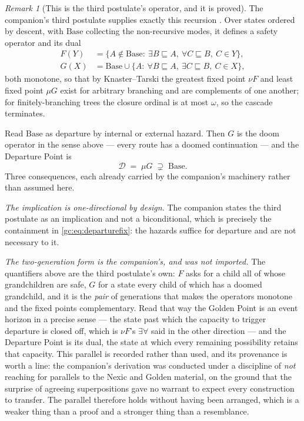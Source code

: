 \documentclass[11pt]{article}
\numberwithin{equation}{section}
\theoremstyle{plain}
\theoremstyle{definition}
\theoremstyle{remark}
\newtheorem{remark}[theorem]{Remark}
\begin{document}
\begin{remark}[This is the third postulate's operator, and it is proved]
\label{gc:rem:thirdpostulate}
The companion's third postulate supplies exactly this recursion
\cite{Aethus}. Over states ordered by descent, with $\mathrm{Base}$
collecting the non-recursive modes, it defines a safety operator and
its dual
\begin{align*}
F(Y)&=\bigl\{A\notin\mathrm{Base}:\ \exists B\sqsubseteq A,\
\forall C\sqsubseteq B,\ C\in Y\bigr\},\\
G(X)&=\mathrm{Base}\cup\bigl\{A:\ \forall B\sqsubseteq A,\
\exists C\sqsubseteq B,\ C\in X\bigr\},
\end{align*}
both monotone, so that by Knaster--Tarski the greatest fixed point
$\nu F$ and least fixed point $\mu G$ exist for arbitrary branching and
are complements of one another; for finitely-branching trees the
closure ordinal is at most $\omega$, so the cascade terminates.

Read $\mathrm{Base}$ as departure by internal or external hazard.
Then $G$ is the doom operator in the sense above --- every route has a
doomed continuation --- and the Departure Point is
\begin{equation}\label{gc:eq:departurefix}
\mathcal{D}\;=\;\mu G\;\supsetneq\;\mathrm{Base}.
\end{equation}
Three consequences, each already carried by the companion's
machinery rather than assumed here.

\emph{The implication is one-directional by design.} The companion
states the third postulate as an implication and not a biconditional,
which is precisely the containment in \eqref{gc:eq:departurefix}: the
hazards suffice for departure and are not necessary to it.

\emph{The two-generation form is the companion's, and was not imported.}
The quantifiers above are the third postulate's own: $F$ asks for a child
all of whose grandchildren are safe, $G$ for a state every child of which
has a doomed grandchild, and it is the \emph{pair} of generations that
makes the operators monotone and the fixed points complementary. Read
that way the Golden Point is an event horizon in a precise sense --- the
state past which the capacity to trigger departure is closed off, which
is $\nu F$'s $\exists\forall$ said in the other direction --- and the
Departure Point is its dual, the state at which every remaining
possibility retains that capacity. This parallel is recorded rather than
used, and its provenance is worth a line: the companion's derivation was
conducted under a discipline of \emph{not} reaching for parallels to the
Nexic and Golden material, on the ground that the surprise of agreeing
superpositions gave no warrant to expect every construction to transfer.
The parallel therefore holds without having been arranged, which is a
weaker thing than a proof and a stronger thing than a resemblance.


\end{remark}
\end{document}
